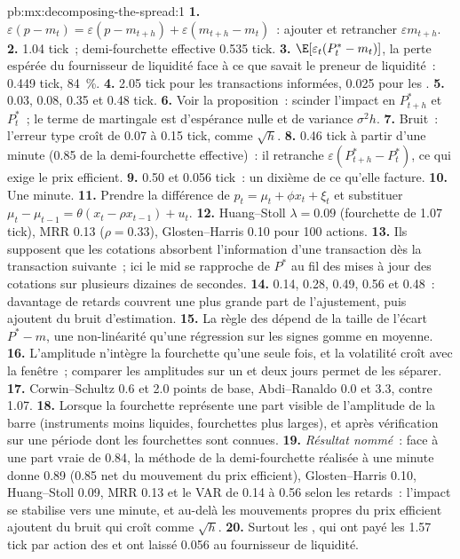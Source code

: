 \begin{solution}{pb:mx:decomposing-the-spread:1}
\textbf{1.} $\varepsilon(p-m_t)=\varepsilon(p-m_{t+h})+\varepsilon(m_{t+h}-m_t)$~: ajouter et retrancher $\varepsilon m_{t+h}$.
\textbf{2.}  1.04 tick~; demi-fourchette effective 0.535 tick.
\textbf{3.} $\E[\varepsilon_t(P^\ast_t-m_t)]$, la perte espérée du fournisseur de liquidité face à ce que savait le preneur de liquidité~: 0.449 tick, 84~\%.
\textbf{4.} 2.05 tick pour les transactions informées, 0.025 pour les .
\textbf{5.} 0.03, 0.08, 0.35 et 0.48 tick.
\textbf{6.} Voir la proposition~: scinder l'impact en $P^\ast_{t+h}$ et $P^\ast_t$~; le terme de martingale est d'espérance nulle et de variance $\sigma^2h$.
\textbf{7.} Bruit~: l'erreur type croît de 0.07 à 0.15 tick, comme $\sqrt h$.
\textbf{8.} 0.46 tick à partir d'une minute (0.85 de la demi-fourchette effective)~: il retranche $\varepsilon(P^\ast_{t+h}-P^\ast_t)$, ce qui exige le
prix efficient.
\textbf{9.} 0.50 et 0.056 tick~: un dixième de ce qu'elle facture.
\textbf{10.} Une minute.
\textbf{11.} Prendre la différence de $p_t=\mu_t+\phi x_t+\xi_t$ et substituer $\mu_t-\mu_{t-1}=\theta(x_t-\rho x_{t-1})+u_t$.
\textbf{12.} Huang--Stoll $\lambda=0.09$ (fourchette de 1.07 tick), MRR 0.13 ($\rho=0.33$), Glosten--Harris 0.10 pour 100 actions.
\textbf{13.} Ils supposent que les cotations absorbent l'information d'une transaction dès la transaction suivante~; ici le mid se rapproche de $P^\ast$ au fil des mises à jour des cotations sur plusieurs dizaines de
secondes.
\textbf{14.} 0.14, 0.28, 0.49, 0.56 et 0.48~: davantage de retards couvrent une plus grande part de l'ajustement, puis ajoutent du bruit d'estimation.
\textbf{15.} La règle des  dépend de la taille de l'écart $P^\ast-m$, une non-linéarité qu'une régression sur les signes gomme en moyenne.
\textbf{16.} L'amplitude n'intègre la fourchette qu'une seule fois, et la volatilité croît avec la fenêtre~; comparer les amplitudes sur un et deux jours permet de les séparer.
\textbf{17.} Corwin--Schultz 0.6 et 2.0 points de base, Abdi--Ranaldo 0.0 et 3.3, contre 1.07.
\textbf{18.} Lorsque la fourchette représente une part visible de l'amplitude de la barre (instruments moins liquides, fourchettes plus larges), et après vérification sur une période dont les fourchettes sont connues.
\textbf{19.} \emph{Résultat nommé}~: face à une part vraie de 0.84, la méthode de la demi-fourchette réalisée à une minute donne 0.89 (0.85 net du mouvement du prix efficient),
Glosten--Harris 0.10, Huang--Stoll 0.09, MRR 0.13 et le VAR de 0.14 à 0.56 selon les retards~: l'impact se stabilise vers une minute, et au-delà
les mouvements propres du prix efficient ajoutent du bruit qui croît comme $\sqrt h$.
\textbf{20.} Surtout les , qui ont payé les 1.57 tick par action des  et ont laissé 0.056 au fournisseur de liquidité.
\end{solution}

